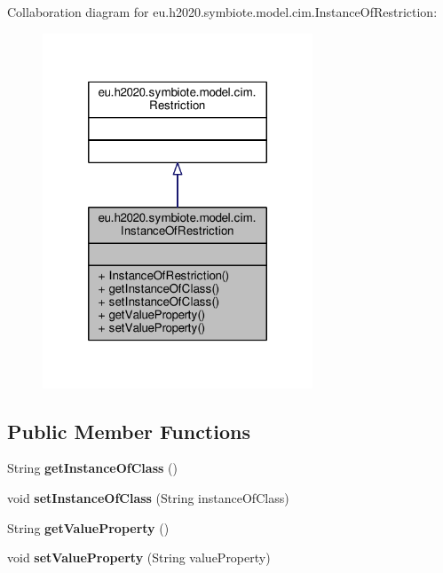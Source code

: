 Collaboration diagram for eu.\+h2020.\+symbiote.\+model.\+cim.\+Instance\+Of\+Restriction\+:
\nopagebreak
\begin{figure}[H]
\begin{center}
\leavevmode
\includegraphics[width=228pt]{classeu_1_1h2020_1_1symbiote_1_1model_1_1cim_1_1InstanceOfRestriction__coll__graph}
\end{center}
\end{figure}
\subsection*{Public Member Functions}
\begin{DoxyCompactItemize}
\item 
\mbox{\label{classeu_1_1h2020_1_1symbiote_1_1model_1_1cim_1_1InstanceOfRestriction_a173517c4d7ad307a595f47e4e8820e51}} 
String {\bfseries get\+Instance\+Of\+Class} ()
\item 
\mbox{\label{classeu_1_1h2020_1_1symbiote_1_1model_1_1cim_1_1InstanceOfRestriction_a7d165c9b5acba06bbd3439977ccd4e90}} 
void {\bfseries set\+Instance\+Of\+Class} (String instance\+Of\+Class)
\item 
\mbox{\label{classeu_1_1h2020_1_1symbiote_1_1model_1_1cim_1_1InstanceOfRestriction_a9bc86ccf13b1a8097fb3f8c0a0867e18}} 
String {\bfseries get\+Value\+Property} ()
\item 
\mbox{\label{classeu_1_1h2020_1_1symbiote_1_1model_1_1cim_1_1InstanceOfRestriction_a2226c87377d30a10b77335f96d45cd0d}} 
void {\bfseries set\+Value\+Property} (String value\+Property)
\end{DoxyCompactItemize}


